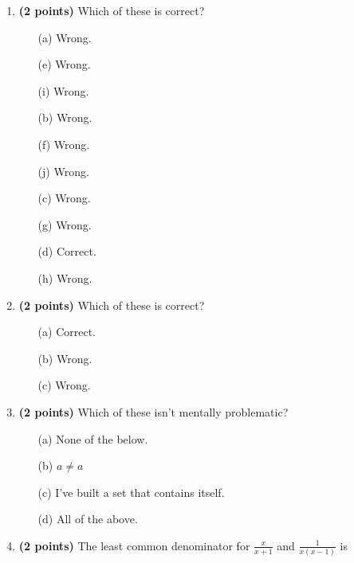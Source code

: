 \documentclass[12pt]{amsart}
\begin{document}
\newpage
\begin{enumerate}
\item {\bf (2 points)} 
 Which of these is correct?

\begin{minipage}[t]{1.0\linewidth}\begin{multicols}{4}\begin{itemize}\item[(a)]  Wrong. \item[(e)]  Wrong. \item[(i)]  Wrong. \item[(b)]  Wrong. \item[(f)]  Wrong. \item[(j)]  Wrong. \item[(c)]  Wrong. \item[(g)]  Wrong. \item[] \item[(d)]  Correct. \item[(h)]  Wrong. \item[] \end{itemize}\end{multicols}\end{minipage} \vfill 
\item {\bf (2 points)} 
 Which of these is correct?

\begin{minipage}[t]{1.0\linewidth}\begin{multicols}{3}\begin{itemize}\item[(a)]  Correct. \item[(b)]  Wrong. \item[(c)]  Wrong. \end{itemize}\end{multicols}\end{minipage} \vfill 
\item {\bf (2 points)} 
 Which of these isn't mentally problematic?

\begin{minipage}[t]{1.0\linewidth}\begin{itemize}\item[(a)]  None of the below.  \item[(b)]  $a \neq a$ \item[(c)]  I've built a set that contains itself. \item[(d)]   All of the above. \end{itemize}\end{minipage} \vfill 
\item {\bf (2 points)} 
 The least common denominator for $\displaystyle \frac{x}{x+1}$ and $\displaystyle \frac{1}{x(x-1)}$ is \vspace{.2cm}


\end{enumerate}
\end{document}
